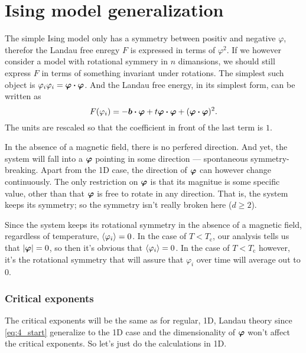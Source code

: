 \documentclass[11pt,letter, swedish, english
]{article}
\newcommand{\Tc}{\ensuremath{T_{\text{c}}}}
\begin{document}
\section{Ising model generalization}
The simple Ising model only has a symmetry between positiv and
negative $\varphi$, therefor the Landau free enregy $F$ is expressed in
terms of $\varphi^2$. If we however consider a model with rotational
symmery in $n$ dimansions, we should still express $F$ in terms of
something invariant under rotations. The simplest such object is
$\varphi_i\varphi_i=\vb*{\varphi}\vdot\vb*{\varphi}$. And the Landau
free energy, in its simplest form, can be written as
\begin{equation}\label{eq:4_start}
F(\varphi_i)=-\vb*{b}\vdot\vb*{\varphi}+t\vb*{\varphi}\vdot\vb*{\varphi}
+(\vb*{\varphi}\vdot\vb*{\varphi})^2.
\end{equation}
The units are rescaled so that the coefficient in front of the
last term is $1$. 

In the absence of a magnetic field, there is no perfered
direction. And yet, the system will fall into a $\vb*\varphi$ pointing
in some direction --- spontaneous symmetry-breaking. Apart from the 1D
case, the direction of $\vb*\varphi$ can however change continuously. The only
restriction on $\vb*\varphi$ is that its magnitue is some specific
value, other than that $\vb*\varphi$ is free to rotate in any
direction. That is, the system keeps its symmetry; so the symmetry
isn't really broken here ($d\ge2$).

Since the system keeps its rotational symmetry in the absence of a
magnetic field, regardless of temperature, $\ev{\varphi_i}=0$. In the
case of $T<\Tc$, our analysis tells us that $|\vb*\varphi|=0$, so then
it's obvious that $\ev{\varphi_i}=0$. In the case of $T<\Tc$ however,
it's the rotational symmetry that will assure that $\varphi_i$ over
time will average out to 0. 





\subsubsection*{Critical exponents}
The critical exponents will be the same as for regular, 1D, Landau
theory since \eqref{eq:4_start} generalize to the 1D case and the
dimensionality of $\vb*\varphi$ won't affect the critical exponents. 
So let's just do the calculations in 1D\footnotemark{}.
\end{document}
